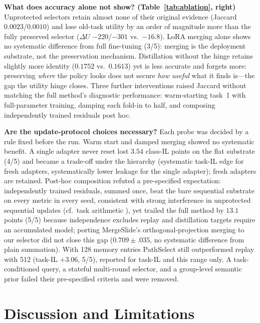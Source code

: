 \documentclass{article}
\begin{document}
\textbf{What does accuracy alone not show? (Table~\ref{tab:ablation}, right)}
Unprotected selectors retain almost none of their original evidence (Jaccard $0.0023$/$0.0010$) and lose old-task utility by an order of magnitude more than the fully preserved selector ($\Delta U$ $-220$/$-301$ vs.\ $-16.8$). LoRA merging alone shows no systematic difference from full fine-tuning (3/5): merging is the deployment substrate, not the preservation mechanism. Distillation without the hinge retains slightly more identity ($0.1752$ vs.\ $0.1613$) yet is less accurate and forgets more: preserving \emph{where} the policy looks does not secure \emph{how useful} what it finds is---the gap the utility hinge closes. Three further interventions raised Jaccard without matching the full method's diagnostic performance: warm-starting task~1 with full-parameter training, damping each fold-in to half, and composing independently trained residuals post hoc.

\textbf{Are the update-protocol choices necessary?}
Each probe was decided by a rule fixed before the run. Warm start and damped merging showed no systematic benefit. A single adapter never reset lost $3.54$ class-IL points on the flat substrate (4/5) and became a trade-off under the hierarchy (systematic task-IL edge for fresh adapters, systematically lower leakage for the single adapter); fresh adapters are retained. Post-hoc composition refuted a pre-specified expectation: independently trained residuals, summed once, beat the bare sequential substrate on every metric in every seed, consistent with strong interference in unprotected sequential updates (cf.\ task arithmetic \cite{ilharco2023task}), yet trailed the full method by $13.1$ points (5/5) because independence excludes replay and distillation targets require an accumulated model; porting MergeSlide's orthogonal-projection merging \cite{bui2026mergeslide} to our selector did not close this gap ($0.709{\pm}.035$, no systematic difference from plain summation). With 128 memory entries PathSelect still outperformed replay with 512 (task-IL $+3.06$, 5/5), reported for task-IL and this range only. A task-conditioned query, a stateful multi-round selector, and a group-level semantic prior failed their pre-specified criteria and were removed.

\FloatBarrier
\section{Discussion and Limitations}
\label{sec:discussion}
\end{document}
